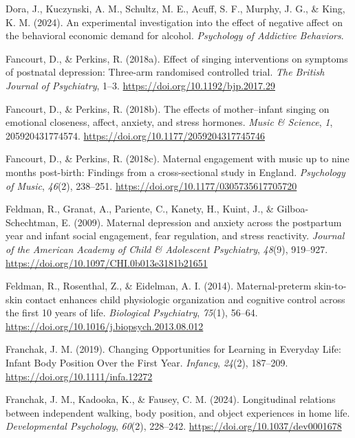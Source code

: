 \documentclass[
]{article}
\newlength{\cslhangindent}
\newenvironment{CSLReferences}[2] %
 {\begin{list}{}{%
  \setlength{\itemindent}{0pt}
  \setlength{\leftmargin}{0pt}
  \setlength{\parsep}{0pt}
  \ifodd #1
   \setlength{\leftmargin}{\cslhangindent}
   \setlength{\itemindent}{-1\cslhangindent}
  \fi
  \setlength{\itemsep}{#2\baselineskip}}}
 {\end{list}}
\begin{document}
\begin{CSLReferences}{1}{0}
Dora, J., Kuczynski, A. M., Schultz, M. E., Acuff, S. F., Murphy, J. G.,
\& King, K. M. (2024). An experimental investigation into the effect of
negative affect on the behavioral economic demand for alcohol.
\emph{Psychology of Addictive Behaviors}.

Fancourt, D., \& Perkins, R. (2018a). Effect of singing interventions on
symptoms of postnatal depression: Three-arm randomised controlled trial.
\emph{The British Journal of Psychiatry}, 1--3.
\url{https://doi.org/10.1192/bjp.2017.29}

Fancourt, D., \& Perkins, R. (2018b). The effects of mother--infant
singing on emotional closeness, affect, anxiety, and stress hormones.
\emph{Music \& Science}, \emph{1}, 205920431774574.
\url{https://doi.org/10.1177/2059204317745746}

Fancourt, D., \& Perkins, R. (2018c). Maternal engagement with music up
to nine months post-birth: {Findings} from a cross-sectional study in
{England}. \emph{Psychology of Music}, \emph{46}(2), 238--251.
\url{https://doi.org/10.1177/0305735617705720}

Feldman, R., Granat, A., Pariente, C., Kanety, H., Kuint, J., \&
Gilboa-Schechtman, E. (2009). Maternal depression and anxiety across the
postpartum year and infant social engagement, fear regulation, and
stress reactivity. \emph{Journal of the American Academy of Child \&
Adolescent Psychiatry}, \emph{48}(9), 919--927.
\url{https://doi.org/10.1097/CHI.0b013e3181b21651}

Feldman, R., Rosenthal, Z., \& Eidelman, A. I. (2014). Maternal-preterm
skin-to-skin contact enhances child physiologic organization and
cognitive control across the first 10 years of life. \emph{Biological
Psychiatry}, \emph{75}(1), 56--64.
\url{https://doi.org/10.1016/j.biopsych.2013.08.012}

Franchak, J. M. (2019). Changing {Opportunities} for {Learning} in
{Everyday Life}: {Infant Body Position Over} the {First Year}.
\emph{Infancy}, \emph{24}(2), 187--209.
\url{https://doi.org/10.1111/infa.12272}

Franchak, J. M., Kadooka, K., \& Fausey, C. M. (2024). Longitudinal
relations between independent walking, body position, and object
experiences in home life. \emph{Developmental Psychology}, \emph{60}(2),
228--242. \url{https://doi.org/10.1037/dev0001678}


\end{CSLReferences}
\end{document}
